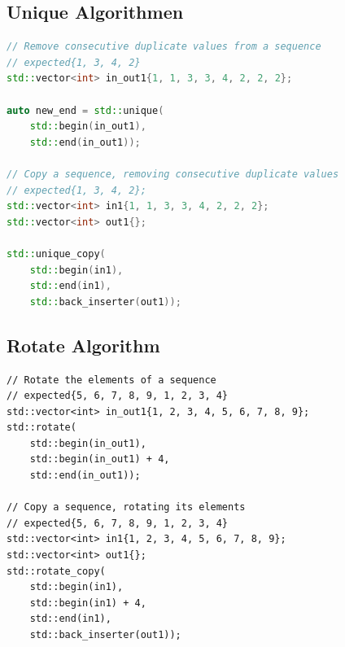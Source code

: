 \subsection{Unique Algorithmen}
\begin{lstlisting}[language=C++, caption=Unique Algorithmen]
// Remove consecutive duplicate values from a sequence
// expected{1, 3, 4, 2}
std::vector<int> in_out1{1, 1, 3, 3, 4, 2, 2, 2};

auto new_end = std::unique(
	std::begin(in_out1),
	std::end(in_out1));

// Copy a sequence, removing consecutive duplicate values
// expected{1, 3, 4, 2};
std::vector<int> in1{1, 1, 3, 3, 4, 2, 2, 2};
std::vector<int> out1{};

std::unique_copy(
	std::begin(in1),
	std::end(in1),
	std::back_inserter(out1));
\end{lstlisting}

\subsection{Rotate Algorithm}
\begin{lstlisting}
// Rotate the elements of a sequence
// expected{5, 6, 7, 8, 9, 1, 2, 3, 4}
std::vector<int> in_out1{1, 2, 3, 4, 5, 6, 7, 8, 9};
std::rotate(
	std::begin(in_out1),
	std::begin(in_out1) + 4,
	std::end(in_out1));

// Copy a sequence, rotating its elements
// expected{5, 6, 7, 8, 9, 1, 2, 3, 4}
std::vector<int> in1{1, 2, 3, 4, 5, 6, 7, 8, 9};
std::vector<int> out1{};
std::rotate_copy(
	std::begin(in1),
	std::begin(in1) + 4,
	std::end(in1),
	std::back_inserter(out1));
\end{lstlisting}

